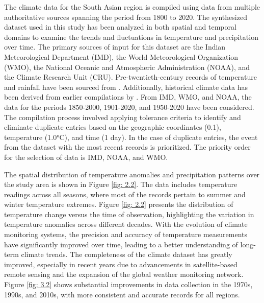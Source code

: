 The climate data for the South Asian region is compiled using data from multiple authoritative sources spanning the period from 1800 to 2020. The synthesized dataset used in this study has been analyzed in both spatial and temporal domains to examine the trends and fluctuations in temperature and precipitation over time. The primary sources of input for this dataset are the Indian Meteorological Department (IMD), the World Meteorological Organization (WMO), the National Oceanic and Atmospheric Administration (NOAA), and the Climate Research Unit (CRU). Pre-twentieth-century records of temperature and rainfall have been sourced from \textcite{yadav_crustal_2022}. Additionally, historical climate data has been derived from earlier compilations by \textcite{babu_updated_2023}. From IMD, WMO, and NOAA, the data for the periods 1850-2000, 1901-2020, and 1950-2020 have been considered. The compilation process involved applying tolerance criteria to identify and eliminate duplicate entries based on the geographic coordinates (0.1\textdegree), temperature (1.0°C), and time (1 day). In the case of duplicate entries, the event from the dataset with the most recent records is prioritized. The priority order for the selection of data is IMD, NOAA, and WMO.\par

The spatial distribution of temperature anomalies and precipitation patterns over the study area is shown in Figure \ref{fig: 2.2}. The data includes temperature readings across all seasons, where most of the records pertain to summer and winter temperature extremes. Figure \ref{fig: 2.2} presents the distribution of temperature change versus the time of observation, highlighting the variation in temperature anomalies across different decades. With the evolution of climate monitoring systems, the precision and accuracy of temperature measurements have significantly improved over time, leading to a better understanding of long-term climate trends. The completeness of the climate dataset has greatly improved, especially in recent years due to advancements in satellite-based remote sensing and the expansion of the global weather monitoring network. Figure \ref{fig: 3.2} shows substantial improvements in data collection in the 1970s, 1990s, and 2010s, with more consistent and accurate records for all regions.\par

